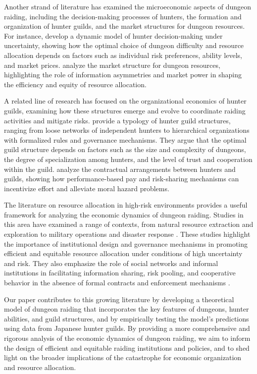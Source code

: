 \documentclass[12pt, a4paper]{article}
\begin{document}
Another strand of literature has examined the microeconomic aspects of dungeon raiding, including the decision-making processes of hunters, the formation and organization of hunter guilds, and the market structures for dungeon resources. For instance, \citet{nakagawa2026decision} develop a dynamic model of hunter decision-making under uncertainty, showing how the optimal choice of dungeon difficulty and resource allocation depends on factors such as individual risk preferences, ability levels, and market prices. \citet{wu2027market} analyze the market structure for dungeon resources, highlighting the role of information asymmetries and market power in shaping the efficiency and equity of resource allocation.

A related line of research has focused on the organizational economics of hunter guilds, examining how these structures emerge and evolve to coordinate raiding activities and mitigate risks. \citet{sato2026guilds} provide a typology of hunter guild structures, ranging from loose networks of independent hunters to hierarchical organizations with formalized rules and governance mechanisms. They argue that the optimal guild structure depends on factors such as the size and complexity of dungeons, the degree of specialization among hunters, and the level of trust and cooperation within the guild. \citet{watanabe2027contracts} analyze the contractual arrangements between hunters and guilds, showing how performance-based pay and risk-sharing mechanisms can incentivize effort and alleviate moral hazard problems.

The literature on resource allocation in high-risk environments provides a useful framework for analyzing the economic dynamics of dungeon raiding. Studies in this area have examined a range of contexts, from natural resource extraction and exploration to military operations and disaster response \citep{chowdhury2026resource, davis2025allocation}. These studies highlight the importance of institutional design and governance mechanisms in promoting efficient and equitable resource allocation under conditions of high uncertainty and risk. They also emphasize the role of social networks and informal institutions in facilitating information sharing, risk pooling, and cooperative behavior in the absence of formal contracts and enforcement mechanisms \citep{nguyen2027social}.

Our paper contributes to this growing literature by developing a theoretical model of dungeon raiding that incorporates the key features of dungeons, hunter abilities, and guild structures, and by empirically testing the model's predictions using data from Japanese hunter guilds. By providing a more comprehensive and rigorous analysis of the economic dynamics of dungeon raiding, we aim to inform the design of efficient and equitable raiding institutions and policies, and to shed light on the broader implications of the catastrophe for economic organization and resource allocation.
\end{document}
